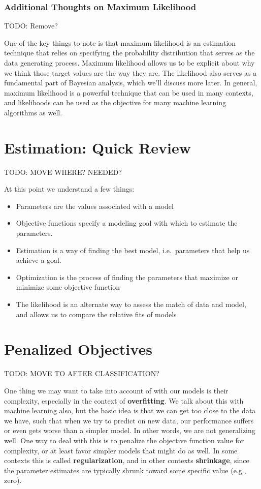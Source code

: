 \documentclass[
  letterpaper,
]{krantz}
\providecommand{\tightlist}{%
  \setlength{\itemsep}{0pt}\setlength{\parskip}{0pt}}\usepackage{longtable,booktabs,array}
\begin{document}
\subsubsection{Additional Thoughts on Maximum
Likelihood}\label{sec-estim-maxlike-add}

TODO: Remove?

One of the key things to note is that maximum likelihood is an
estimation technique that relies on specifying the probability
distribution that serves as the data generating process. Maximum
likelihood allows us to be explicit about why we think those target
values are the way they are. The likelihood also serves as a fundamental
part of Bayesian analysis, which we'll discuss more later. In general,
maximum likelihood is a powerful technique that can be used in many
contexts, and likelihoods can be used as the objective for many machine
learning algorithms as well.

\section{Estimation: Quick Review}\label{sec-estim-review}

TODO: MOVE WHERE? NEEDED?

At this point we understand a few things:

\begin{itemize}
\tightlist
\item
  Parameters are the values associated with a model
\item
  Objective functions specify a modeling goal with which to estimate the
  parameters.
\item
  Estimation is a way of finding the best model, i.e.~parameters that
  help us achieve a goal.
\item
  Optimization is the process of finding the parameters that maximize or
  minimize some objective function
\item
  The likelihood is an alternate way to assess the match of data and
  model, and allows us to compare the relative fits of models
\end{itemize}

\section{Penalized Objectives}\label{sec-estim-penalty}

TODO: MOVE TO AFTER CLASSIFICATION?

One thing we may want to take into account of with our models is their
complexity, especially in the context of \textbf{overfitting}. We talk
about this with machine learning also, but the basic idea is that we can
get too close to the data we have, such that when we try to predict on
new data, our performance suffers or even gets worse than a simpler
model. In other words, we are not generalizing well. One way to deal
with this is to penalize the objective function value for complexity, or
at least favor simpler models that might do as well. In some contexts
this is called \textbf{regularization}, and in other contexts
\textbf{shrinkage}, since the parameter estimates are typically shrunk
toward some specific value (e.g., zero).
\end{document}
